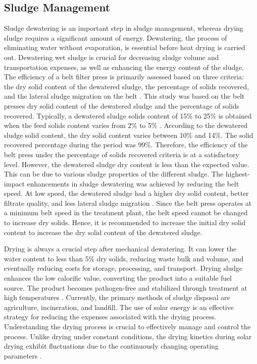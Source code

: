\subsection{Sludge Management}
Sludge dewatering is an important step in sludge management, whereas drying sludge requires a significant amount of energy. Dewatering, the process of eliminating water without evaporation, is essential before heat drying is carried out. Dewatering wet sludge is crucial for decreasing sludge volume and transportation expenses, as well as enhancing the energy content of the sludge\cite{Chen2002}. The efficiency of a belt filter press is primarily assessed based on three criteria: the dry solid content of the dewatered sludge, the percentage of solids recovered, and the lateral sludge migration on the belt \cite{Olivier2005}. This study was based on the belt presses dry solid content of the dewatered sludge and the percentage of solids recovered. Typically, a dewatered sludge solids content of 15\% to 25\% is obtained when the feed solids content varies from 2\% to 5\% \cite{Mamais2009}. According to the dewatered sludge solid content, the dry solid content varies between 10\% and 14\%.  The solid recovered percentage during the period was 99\%. Therefore, the efficiency of the belt press under the percentage of solids recovered criteria is at a satisfactory level. However, the dewatered sludge dry content is less than the expected value. This can be due to various sludge properties of the different sludge. The highest-impact enhancements in sludge dewatering was achieved by reducing the belt speed. At low speed, the dewatered sludge had a higher dry solid content, better filtrate quality, and less lateral sludge migration \cite{Olivier2005}. Since the belt press operates at a minimum belt speed in the treatment plant, the belt speed cannot be changed to increase dry solids. Hence, it is recommended to increase the initial dry solid content to increase the dry solid content of the dewatered sludge.

Drying is always a crucial step after mechanical dewatering. It can lower the water content to less than 5\% dry solids, reducing waste bulk and volume, and eventually reducing costs for storage, processing, and transport. Drying sludge enhances the low calorific value, converting the product into a suitable fuel source. The product becomes pathogen-free and stabilized through treatment at high temperatures \cite{Leonard2008} \cite{Bennamoun2012}. Currently, the primary methods of sludge disposal are agriculture, incineration, and landfill. The use of solar energy is an effective strategy for reducing the expenses associated with the drying process. Understanding the drying process is crucial to effectively manage and control the process. Unlike drying under constant conditions, the drying kinetics during solar drying exhibit fluctuations due to the continuously changing operating parameters \cite{Bennamoun2012}.

